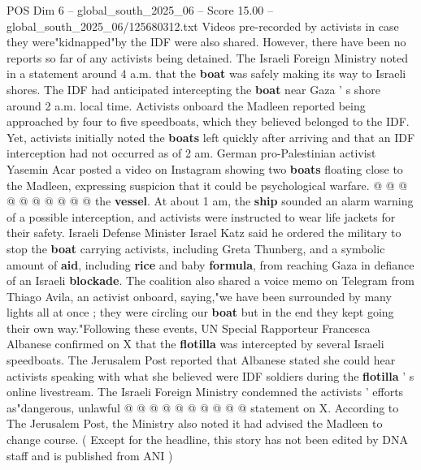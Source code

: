\begin{textsample}{POS Dim 6 – global\_south\_2025\_06 – Score 15.00 – global\_south\_2025\_06/125680312.txt}
Videos pre-recorded by activists in case they were"kidnapped"by the IDF were also shared.
However, there have been no reports so far of any activists being detained.
The Israeli Foreign Ministry noted in a statement around 4 a.m. that the \textbf{boat} was safely making its way to Israeli shores.
The IDF had anticipated intercepting the \textbf{boat} near Gaza ' s shore around 2 a.m. local time.
Activists onboard the Madleen reported being approached by four to five speedboats, which they believed belonged to the IDF.
Yet, activists initially noted the \textbf{boats} left quickly after arriving and that an IDF interception had not occurred as of 2 am.
German pro-Palestinian activist Yasemin Acar posted a video on Instagram showing two \textbf{boats} floating close to the Madleen, expressing suspicion that it could be psychological warfare. @ @ @ @ @ @ @ @ @ @ the \textbf{vessel}.
At about 1 am, the \textbf{ship} sounded an alarm warning of a possible interception, and activists were instructed to wear life jackets for their safety.
Israeli Defense Minister Israel Katz said he ordered the military to stop the \textbf{boat} carrying activists, including Greta Thunberg, and a symbolic amount of \textbf{aid}, including \textbf{rice} and baby \textbf{formula}, from reaching Gaza in defiance of an Israeli \textbf{blockade}.
The coalition also shared a voice memo on Telegram from Thiago Avila, an activist onboard, saying,"we have been surrounded by many lights all at once ; they were circling our \textbf{boat} but in the end they kept going their own way."Following these events, UN Special Rapporteur Francesca Albanese confirmed on X that the \textbf{flotilla} was intercepted by several Israeli speedboats.
The Jerusalem Post reported that Albanese stated she could hear activists speaking with what she believed were IDF soldiers during the \textbf{flotilla} ' s online livestream.
The Israeli Foreign Ministry condemned the activists ' efforts as"dangerous, unlawful @ @ @ @ @ @ @ @ @ @ statement on X.
According to The Jerusalem Post, the Ministry also noted it had advised the Madleen to change course. ( Except for the headline, this story has not been edited by DNA staff and is published from ANI )

\end{textsample}
